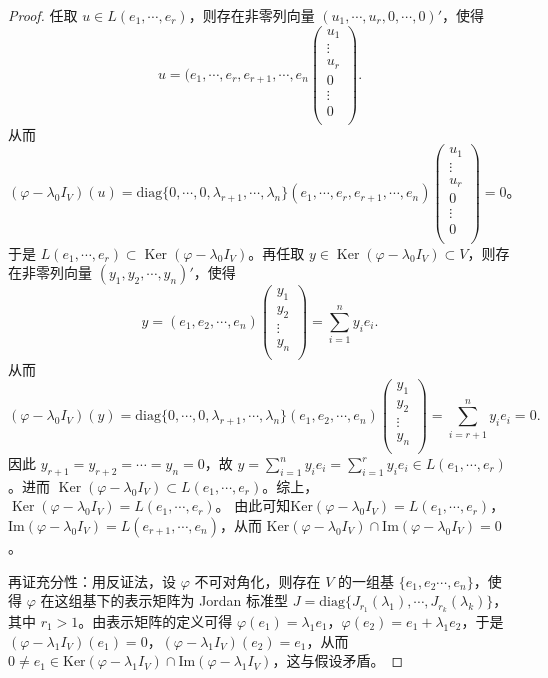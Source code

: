 \documentclass[../../main.tex]{subfiles}%
\begin{document}
\begin{proof}
任取 \(u \in L(e_1, \cdots, e_r)\)，则存在非零列向量 \((u_1, \cdots, u_r, 0, \cdots, 0)'\)，使得
\[
u=(e_1,\cdots ,e_r,e_{r+1},\cdots ,e_n\left( \begin{array}{c}
u_1\\
\vdots\\
u_r\\
0\\
\vdots\\
0\\
\end{array} \right) .
\]
从而
\[
(\varphi -\lambda _0I_V)(u)=\mathrm{diag}\{0,\cdots ,0,\lambda _{r+1},\cdots ,\lambda _n\}(e_1,\cdots ,e_r,e_{r+1},\cdots ,e_n)\left( \begin{array}{c}
u_1\\
\vdots\\
u_r\\
0\\
\vdots\\
0\\
\end{array} \right) =0\text{。}
\]
于是 \(L(e_1, \cdots, e_r) \subset \operatorname{Ker}(\varphi - \lambda_0 I_V)\)。再任取 \(y \in \operatorname{Ker}(\varphi - \lambda_0 I_V) \subset V\)，则存在非零列向量 \((y_1, y_2, \cdots, y_n)'\)，使得
\[
y=(e_1,e_2,\cdots ,e_n)\left( \begin{array}{c}
y_1\\
y_2\\
\vdots\\
y_n\\
\end{array} \right) =\sum_{i=1}^n{y_ie_i}.
\]
从而
\[
(\varphi -\lambda _0I_V)(y)=\mathrm{diag}\{0,\cdots ,0,\lambda _{r+1},\cdots ,\lambda _n\}(e_1,e_2,\cdots ,e_n)\left( \begin{array}{c}
y_1\\
y_2\\
\vdots\\
y_n\\
\end{array} \right) =\sum_{i=r+1}^n{y_ie_i}=0.
\]
因此 \(y_{r+1} = y_{r+2} = \cdots = y_n = 0\)，故 \(y = \sum_{i=1}^n y_i e_i = \sum_{i=1}^r y_i e_i \in L(e_1, \cdots, e_r)\)。进而 \(\operatorname{Ker}(\varphi - \lambda_0 I_V) \subset L(e_1, \cdots, e_r)\)。综上，\(\operatorname{Ker}(\varphi - \lambda_0 I_V) = L(e_1, \cdots, e_r)\)。
由此可知$\mathrm{Ker}(\varphi - \lambda_0I_V)=L(e_1,\cdots,e_r)$，$\mathrm{Im}(\varphi - \lambda_0I_V)=L(e_{r + 1},\cdots,e_n)$，从而 $\mathrm{Ker}(\varphi - \lambda_0I_V)\cap\mathrm{Im}(\varphi - \lambda_0I_V)=0$。

{\heiti 再证充分性：}用反证法，设 $\varphi$ 不可对角化，则存在 $V$ 的一组基 $\{e_1,e_2\cdots,e_n\}$，使得 $\varphi$ 在这组基下的表示矩阵为 Jordan 标准型 $J = \mathrm{diag}\{J_{r_1}(\lambda_1),\cdots,J_{r_k}(\lambda_k)\}$，其中 $r_1 > 1$。由表示矩阵的定义可得 $\varphi(e_1)=\lambda_1e_1$，$\varphi(e_2)=e_1 + \lambda_1e_2$，于是 $(\varphi - \lambda_1I_V)(e_1)=0$，$(\varphi - \lambda_1I_V)(e_2)=e_1$，从而 $0\neq e_1\in\mathrm{Ker}(\varphi - \lambda_1I_V)\cap\mathrm{Im}(\varphi - \lambda_1I_V)$，这与假设矛盾。

\end{proof}
\end{document}

